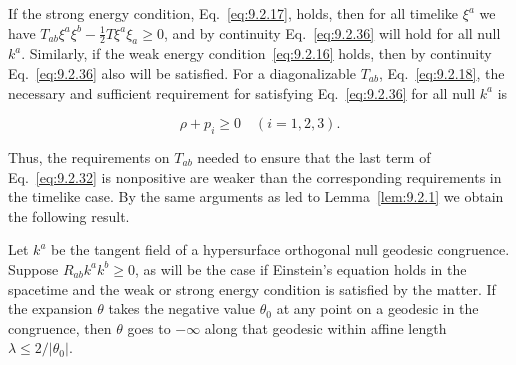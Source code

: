 If the strong energy condition, Eq.~\eqref{eq:9.2.17}, holds, then for all timelike
\(\xi^a\) we have \(T_{ab}\xi^a\xi^b-\frac12T\xi^a\xi_a\geq0\), and by continuity
Eq.~\eqref{eq:9.2.36} will hold for all null \(k^a\). Similarly, if the weak energy
condition~\eqref{eq:9.2.16} holds, then by continuity Eq.~\eqref{eq:9.2.36} also will
be satisfied. For a diagonalizable \(T_{ab}\), Eq.~\eqref{eq:9.2.18}, the necessary and
sufficient requirement for satisfying Eq.~\eqref{eq:9.2.36} for all null \(k^a\) is

\begin{equation}
  \rho+p_i\geq0
  \quad (i=1,2,3) .
  \tag{9.2.37}\label{eq:9.2.37}
\end{equation}

Thus, the requirements on \(T_{ab}\) needed to ensure that the last term of
Eq.~\eqref{eq:9.2.32} is nonpositive are weaker than the corresponding requirements
in the timelike case. By the same arguments as led to Lemma~\ref{lem:9.2.1} we obtain
the following result.

\begin{lemma}\label{lem:9.2.2}
Let \(k^a\) be the tangent field of a hypersurface orthogonal null geodesic
congruence. Suppose \(R_{ab}k^ak^b\geq0\), as will be the case if Einstein's equation
holds in the spacetime and the weak or strong energy condition is satisfied by the
matter. If the expansion \(\theta\) takes the negative value \(\theta_0\) at any point
on a geodesic in the congruence, then \(\theta\) goes to \(-\infty\) along that
geodesic within affine length \(\lambda\leq2/\lvert\theta_0\rvert\).
\end{lemma}
